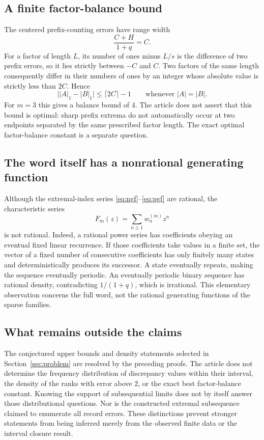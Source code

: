 \documentclass[11pt]{article}
\numberwithin{equation}{section}
\theoremstyle{definition}
\theoremstyle{remark}
\begin{document}
\subsection{A finite factor-balance bound}
The centered prefix-counting errors have range width
\[
\frac{C+H}{1+q}=C.
\]
For a factor of length $L$, its number of ones minus $L/s$ is the
difference of two prefix errors, so it lies strictly between $-C$ and
$C$. Two factors of the same length consequently differ in their numbers
of ones by an integer whose absolute value is strictly less than $2C$.
Hence
\begin{equation}\label{eq:balance-bound}
\bigl||A|_1-|B|_1\bigr|\le\lceil2C\rceil-1
\qquad\text{whenever }|A|=|B|.
\end{equation}
For $m=3$ this gives a balance bound of $4$. The article does not assert
that this bound is optimal: sharp prefix extrema do not automatically
occur at two endpoints separated by the same prescribed factor length.
The exact optimal factor-balance constant is a separate question.

\subsection{The word itself has a nonrational generating function}
Although the extremal-index series \eqref{eq:ngf}--\eqref{eq:pgf} are
rational, the characteristic series
\[
F_m(z)=\sum_{n\ge1}w^{(m)}_n z^n
\]
is not rational. Indeed, a rational power series has coefficients obeying
an eventual fixed linear recurrence. If those coefficients take values
in a finite set, the vector of a fixed number of consecutive coefficients
has only finitely many states and deterministically produces its successor.
A state eventually repeats, making the sequence eventually periodic.
An eventually periodic binary sequence has rational density, contradicting
$1/(1+q)$, which is irrational. This elementary observation concerns the
full word, not the rational generating functions of the sparse families.

\subsection{What remains outside the claims}
The conjectured upper bounds and density statements selected in
Section~\ref{sec:problem} are resolved by the preceding proofs. The
article does not determine the frequency distribution of discrepancy
values within their interval, the density of the ranks with error above
$2$, or the exact best factor-balance constant. Knowing the support of
subsequential limits does not by itself answer those distributional
questions. Nor is the constructed extremal subsequence claimed to enumerate
all record errors. These distinctions prevent stronger statements from
being inferred merely from the observed finite data or the interval
closure result.
\end{document}
